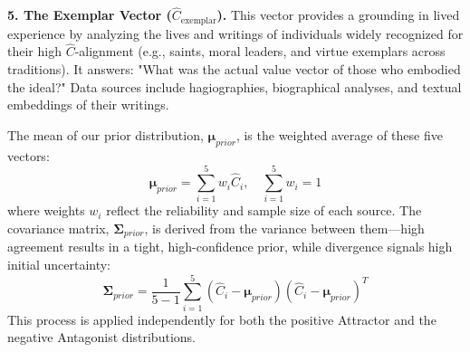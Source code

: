 \documentclass[11pt,a4paper]{article}
\theoremstyle{definition}
\theoremstyle{remark}
\begin{document}
\textbf{5. The Exemplar Vector (\(\hat{C}_{\text{exemplar}}\)).} This vector provides a grounding in lived experience by analyzing the lives and writings of individuals widely recognized for their high \(\hat{C}\)-alignment (e.g., saints, moral leaders, and virtue exemplars across traditions). It answers: "What was the actual value vector of those who embodied the ideal?" Data sources include hagiographies, biographical analyses, and textual embeddings of their writings.

The mean of our prior distribution, \(\boldsymbol{\mu}_{prior}\), is the weighted average of these five vectors:
\begin{equation}
\boldsymbol{\mu}_{prior} = \sum_{i=1}^{5} w_i \hat{C}_i, \quad \sum_{i=1}^{5} w_i = 1
\end{equation}
where weights \(w_i\) reflect the reliability and sample size of each source. The covariance matrix, \(\boldsymbol{\Sigma}_{prior}\), is derived from the variance between them—high agreement results in a tight, high-confidence prior, while divergence signals high initial uncertainty:
\begin{equation}
\boldsymbol{\Sigma}_{prior} = \frac{1}{5-1} \sum_{i=1}^{5} (\hat{C}_i - \boldsymbol{\mu}_{prior})(\hat{C}_i - \boldsymbol{\mu}_{prior})^T
\end{equation}
This process is applied independently for both the positive Attractor and the negative Antagonist distributions.
\end{document}
